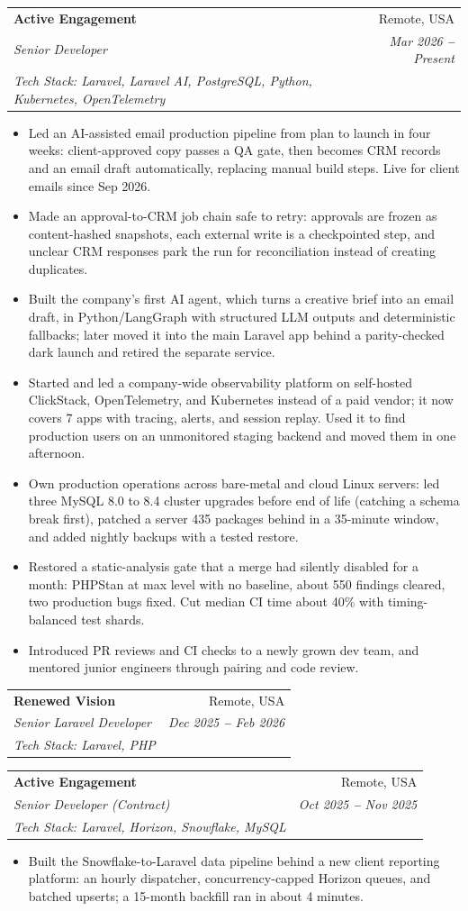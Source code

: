 \documentclass[letterpaper,11pt]{article}
\makeatletter
\newcommand{\resumeItem}[1]{
    \item\small{
            {#1 \vspace{-2pt}}
    }
}
\newcommand{\resumeSubheading}[5]{
    \vspace{-2pt}\item
    \begin{tabular*}{0.97\textwidth}[t]{l@{\extracolsep{\fill}}r}
    \textbf{#1} & #2 \\
    \textit{\small#3} & \textit{\small #4} \\
    \textit{\small#5} \\
    \end{tabular*}\vspace{-7pt}
}
\newcommand{\resumeItemListStart}{\begin{itemize}}
\newcommand{\resumeItemListEnd}{\end{itemize}\vspace{-5pt}}
\makeatother
\begin{document}
    \resumeSubheading%
    {Active Engagement}{Remote, USA}
    {Senior Developer}{Mar 2026 \textbf{--} Present}
    {Tech Stack: Laravel, Laravel AI, PostgreSQL, Python, Kubernetes, OpenTelemetry}
    \resumeItemListStart{}
    \resumeItem{Led an AI-assisted email production pipeline from plan to launch in four weeks: client-approved copy passes a QA gate, then becomes CRM records and an email draft automatically, replacing manual build steps. Live for client emails since Sep 2026.}
    \resumeItem{Made an approval-to-CRM job chain safe to retry: approvals are frozen as content-hashed snapshots, each external write is a checkpointed step, and unclear CRM responses park the run for reconciliation instead of creating duplicates.}
    \resumeItem{Built the company's first AI agent, which turns a creative brief into an email draft, in Python/LangGraph with structured LLM outputs and deterministic fallbacks; later moved it into the main Laravel app behind a parity-checked dark launch and retired the separate service.}
    \resumeItem{Started and led a company-wide observability platform on self-hosted ClickStack, OpenTelemetry, and Kubernetes instead of a paid vendor; it now covers 7 apps with tracing, alerts, and session replay. Used it to find production users on an unmonitored staging backend and moved them in one afternoon.}
    \resumeItem{Own production operations across bare-metal and cloud Linux servers: led three MySQL 8.0 to 8.4 cluster upgrades before end of life (catching a schema break first), patched a server 435 packages behind in a 35-minute window, and added nightly backups with a tested restore.}
    \resumeItem{Restored a static-analysis gate that a merge had silently disabled for a month: PHPStan at max level with no baseline, about 550 findings cleared, two production bugs fixed. Cut median CI time about 40\% with timing-balanced test shards.}
    \resumeItem{Introduced PR reviews and CI checks to a newly grown dev team, and mentored junior engineers through pairing and code review.}
    \resumeItemListEnd{}

    \resumeSubheading%
    {Renewed Vision}{Remote, USA}
    {Senior Laravel Developer}{Dec 2025 \textbf{--} Feb 2026}
    {Tech Stack: Laravel, PHP}

    \resumeSubheading%
    {Active Engagement}{Remote, USA}
    {Senior Developer (Contract)}{Oct 2025 \textbf{--} Nov 2025}
    {Tech Stack: Laravel, Horizon, Snowflake, MySQL}
    \resumeItemListStart{}
    \resumeItem{Built the Snowflake-to-Laravel data pipeline behind a new client reporting platform: an hourly dispatcher, concurrency-capped Horizon queues, and batched upserts; a 15-month backfill ran in about 4 minutes.}
    \resumeItemListEnd{}
\end{document}

